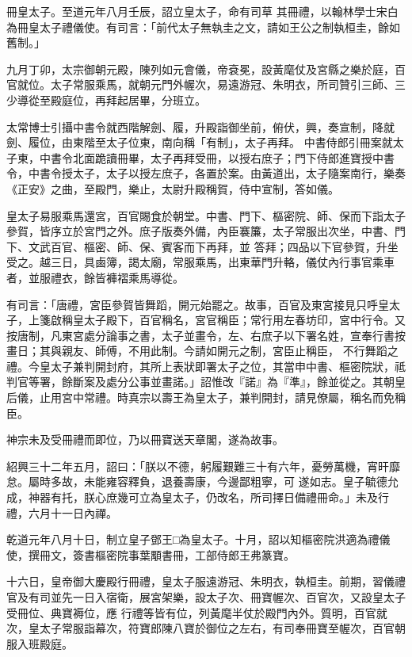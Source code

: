 \begin{pinyinscope}
 冊皇太子。至道元年八月壬辰，詔立皇太子，命有司草
 其冊禮，以翰林學士宋白為冊皇太子禮儀使。有司言：「前代太子無執圭之文，請如王公之制執桓圭，餘如舊制。」



 九月丁卯，太宗御朝元殿，陳列如元會儀，帝袞冕，設黃麾仗及宮縣之樂於庭，百官就位。太子常服乘馬，就朝元門外幄次，易遠游冠、朱明衣，所司贊引三師、三少導從至殿庭位，再拜起居畢，分班立。



 太常博士引攝中書令就西階解劍、履，升殿詣御坐前，俯伏，興，奏宣制，降就劍、履位，由東階至太子位東，南向稱「有制」，太子再拜。
 中書侍郎引冊案就太子東，中書令北面跪讀冊畢，太子再拜受冊，以授右庶子；門下侍郎進寶授中書令，中書令授太子，太子以授左庶子，各置於案。由黃道出，太子隨案南行，樂奏《正安》之曲，至殿門，樂止，太尉升殿稱賀，侍中宣制，答如儀。



 皇太子易服乘馬還宮，百官賜食於朝堂。中書、門下、樞密院、師、保而下詣太子參賀，皆序立於宮門之外。庶子版奏外備，內臣褰簾，太子常服出次坐，中書、門下、文武百官、樞密、師、保、賓客而下再拜，並
 答拜；四品以下官參賀，升坐受之。越三日，具鹵簿，謁太廟，常服乘馬，出東華門升輅，儀仗內行事官乘車者，並服禮衣，餘皆褲褶乘馬導從。



 有司言：「唐禮，宮臣參賀皆舞蹈，開元始罷之。故事，百官及東宮接見只呼皇太子，上箋啟稱皇太子殿下，百官稱名，宮官稱臣；常行用左春坊印，宮中行令。又按唐制，凡東宮處分論事之書，太子並畫令，左、右庶子以下署名姓，宣奉行書按畫日；其與親友、師傅，不用此制。今請如開元之制，宮臣止稱臣，
 不行舞蹈之禮。今皇太子兼判開封府，其所上表狀即署太子之位，其當申中書、樞密院狀，祗判官等署，餘斷案及處分公事並畫諾。」詔惟改『諾』為『準』，餘並從之。其朝皇后儀，止用宮中常禮。時真宗以壽王為皇太子，兼判開封，請見僚屬，稱名而免稱臣。



 神宗未及受冊禮而即位，乃以冊寶送天章閣，遂為故事。



 紹興三十二年五月，詔曰：「朕以不德，躬履艱難三十有六年，憂勞萬機，宵旰靡怠。屬時多故，未能雍容釋負，退養壽康，今邊鄙粗寧，可
 遂如志。皇子毓德允成，神器有托，朕心庶幾可立為皇太子，仍改名，所司擇日備禮冊命。」未及行禮，六月十一日內禪。



 乾道元年八月十日，制立皇子鄧王□為皇太子。十月，詔以知樞密院洪適為禮儀使，撰冊文，簽書樞密院事葉顒書冊，工部侍郎王弗篆寶。



 十六日，皇帝御大慶殿行冊禮，皇太子服遠游冠、朱明衣，執桓圭。前期，習儀禮官及有司並先一日入宿衛，展宮架樂，設太子次、冊寶幄次、百官次，又設皇太子受冊位、典寶褥位，應
 行禮等皆有位，列黃麾半仗於殿門內外。質明，百官就次，皇太子常服詣幕次，符寶郎陳八寶於御位之左右，有司奉冊寶至幄次，百官朝服入班殿庭。




\end{pinyinscope}
